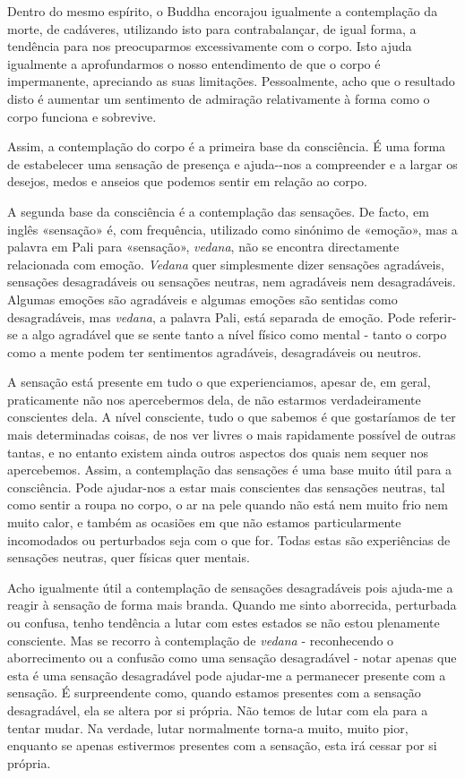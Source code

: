 Dentro do mesmo espírito, o Buddha encorajou igualmente a contemplação
da morte, de cadáveres, utilizando isto para contrabalançar, de igual
forma, a tendência para nos preocuparmos excessivamente com o corpo.
Isto ajuda igualmente a aprofundarmos o nosso entendimento de que o
corpo é impermanente, apreciando as suas limitações. Pessoalmente, acho
que o resultado disto é aumentar um sentimento de admiração
relativamente à forma como o corpo funciona e sobrevive.

Assim, a contemplação do corpo é a primeira base da consciência. É uma
forma de estabelecer uma sensação de presença e ajuda-\linebreak-nos a compreender
e a largar os desejos, medos e anseios que podemos sentir em relação ao
corpo.

A segunda base da consciência é a contemplação das sensações. De facto,
em inglês «sensação» é, com frequência, utilizado como sinónimo de
«emoção», mas a palavra em Pali para «sensação», \emph{vedana}, não se
encontra directamente relacionada com emoção. \emph{Vedana} quer
simplesmente dizer sensações agradáveis, sensações desagradáveis ou
sensações neutras, nem agradáveis nem desagradáveis. Algumas emoções são
agradáveis e algumas emoções são sentidas como desagradáveis, mas
\emph{vedana}, a palavra Pali, está separada de emoção. Pode referir-se
a algo agradável que se sente tanto a nível físico como mental - tanto o
corpo como a mente podem ter sentimentos agradáveis, desagradáveis ou
neutros.

A sensação está presente em tudo o que experienciamos, apesar de, em
geral, praticamente não nos apercebermos dela, de não estarmos
verdadeiramente conscientes dela. A nível consciente, tudo o que sabemos
é que gostaríamos de ter mais determinadas coisas, de nos ver livres o
mais rapidamente possível de outras tantas, e no entanto existem ainda
outros aspectos dos quais nem sequer nos apercebemos. Assim, a
contemplação das sensações é uma base muito útil para a consciência.
Pode ajudar-nos a estar mais conscientes das sensações neutras, tal como
sentir a roupa no corpo, o ar na pele quando não está nem muito frio nem
muito calor, e também as ocasiões em que não estamos particularmente
incomodados ou perturbados seja com o que for. Todas estas são
experiências de sensações neutras, quer físicas quer mentais.

Acho igualmente útil a contemplação de sensações desagradáveis pois
ajuda-me a reagir à sensação de forma mais branda. Quando me sinto
aborrecida, perturbada ou confusa, tenho tendência a lutar com estes
estados se não estou plenamente consciente. Mas se recorro à
contemplação de \emph{vedana} - reconhecendo o aborrecimento ou a
confusão como uma sensação desagradável - notar apenas que esta é uma
sensação desagradável pode ajudar-me a permanecer presente com a
sensação. É surpreendente como, quando estamos presentes com a sensação
desagradável, ela se altera por si própria. Não temos de lutar com ela
para a tentar mudar. Na verdade, lutar normalmente torna-a muito, muito
pior, enquanto se apenas estivermos presentes com a sensação, esta irá
cessar por si própria.

